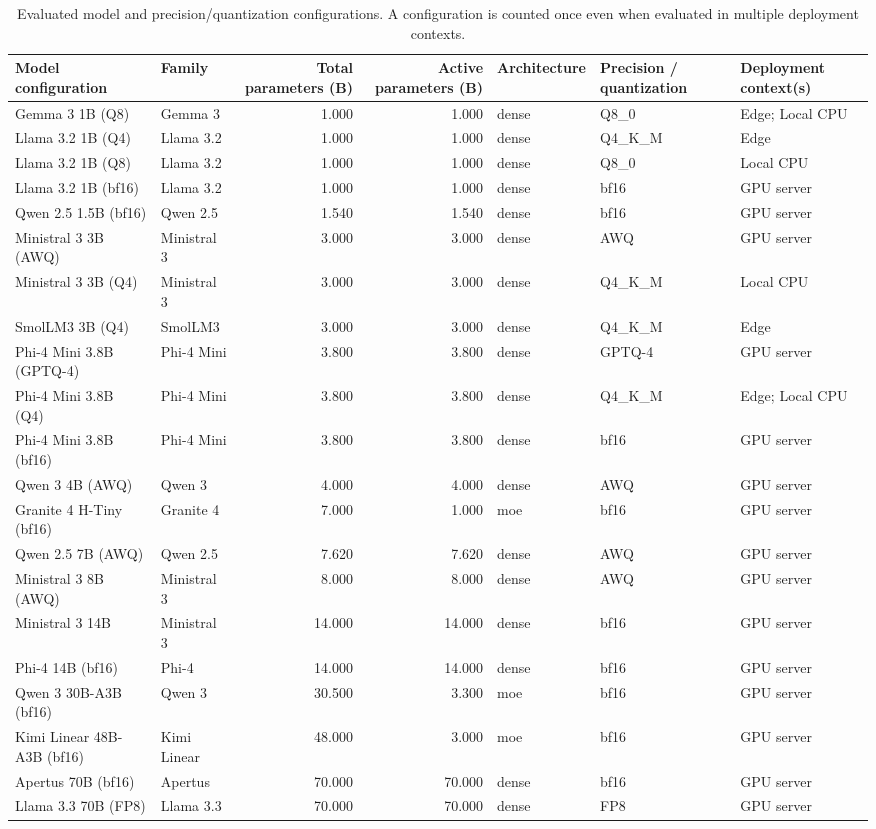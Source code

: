 \begin{table}[t]
\centering
\caption{Evaluated model and precision/quantization configurations. A configuration is counted once even when evaluated in multiple deployment contexts.}
\label{tab:evaluated-models}
\scriptsize
\setlength{\tabcolsep}{3.2pt}
\renewcommand{\arraystretch}{1.08}
\begin{tabularx}{\textwidth}{@{}LLrrLLL@{}}
\toprule
\textbf{Model configuration} & \textbf{Family} & \textbf{Total parameters (B)} & \textbf{Active parameters (B)} & \textbf{Architecture} & \textbf{Precision / quantization} & \textbf{Deployment context(s)} \\
\midrule
Gemma 3 1B (Q8) & Gemma 3 & 1.000 & 1.000 & dense & Q8\_0 & Edge; Local CPU \\
Llama 3.2 1B (Q4) & Llama 3.2 & 1.000 & 1.000 & dense & Q4\_K\_M & Edge \\
Llama 3.2 1B (Q8) & Llama 3.2 & 1.000 & 1.000 & dense & Q8\_0 & Local CPU \\
Llama 3.2 1B (bf16) & Llama 3.2 & 1.000 & 1.000 & dense & bf16 & GPU server \\
Qwen 2.5 1.5B (bf16) & Qwen 2.5 & 1.540 & 1.540 & dense & bf16 & GPU server \\
Ministral 3 3B (AWQ) & Ministral 3 & 3.000 & 3.000 & dense & AWQ & GPU server \\
Ministral 3 3B (Q4) & Ministral 3 & 3.000 & 3.000 & dense & Q4\_K\_M & Local CPU \\
SmolLM3 3B (Q4) & SmolLM3 & 3.000 & 3.000 & dense & Q4\_K\_M & Edge \\
Phi-4 Mini 3.8B (GPTQ-4) & Phi-4 Mini & 3.800 & 3.800 & dense & GPTQ-4 & GPU server \\
Phi-4 Mini 3.8B (Q4) & Phi-4 Mini & 3.800 & 3.800 & dense & Q4\_K\_M & Edge; Local CPU \\
Phi-4 Mini 3.8B (bf16) & Phi-4 Mini & 3.800 & 3.800 & dense & bf16 & GPU server \\
Qwen 3 4B (AWQ) & Qwen 3 & 4.000 & 4.000 & dense & AWQ & GPU server \\
Granite 4 H-Tiny (bf16) & Granite 4 & 7.000 & 1.000 & moe & bf16 & GPU server \\
Qwen 2.5 7B (AWQ) & Qwen 2.5 & 7.620 & 7.620 & dense & AWQ & GPU server \\
Ministral 3 8B (AWQ) & Ministral 3 & 8.000 & 8.000 & dense & AWQ & GPU server \\
Ministral 3 14B & Ministral 3 & 14.000 & 14.000 & dense & bf16 & GPU server \\
Phi-4 14B (bf16) & Phi-4 & 14.000 & 14.000 & dense & bf16 & GPU server \\
Qwen 3 30B-A3B (bf16) & Qwen 3 & 30.500 & 3.300 & moe & bf16 & GPU server \\
Kimi Linear 48B-A3B (bf16) & Kimi Linear & 48.000 & 3.000 & moe & bf16 & GPU server \\
Apertus 70B (bf16) & Apertus & 70.000 & 70.000 & dense & bf16 & GPU server \\
Llama 3.3 70B (FP8) & Llama 3.3 & 70.000 & 70.000 & dense & FP8 & GPU server \\
\bottomrule
\end{tabularx}
\end{table}

